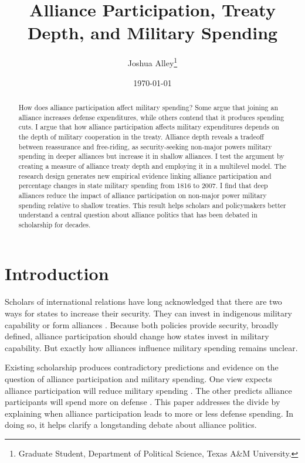 \documentclass[12pt]{article}
\title{\textbf{Alliance Participation, Treaty Depth, and Military Spending}}
\author{Joshua Alley\footnote{Graduate Student,
Department of Political Science, Texas A\&M University.}}
\date{{\normalsize \today}}
\begin{document}
\maketitle 

\doublespace 

\begin{abstract}
How does alliance participation affect military spending? 
Some argue that joining an alliance increases defense expenditures, while others contend that it produces spending cuts.
I argue that how alliance participation affects military expenditures depends on the depth of military cooperation in the treaty. 
Alliance depth reveals a tradeoff between reassurance and free-riding, as security-seeking non-major powers military spending in deeper alliances but increase it in shallow alliances.   
I test the argument by creating a measure of alliance treaty depth and employing it in a multilevel model. 
The research design generates new empirical evidence linking alliance participation and percentage changes in state military spending from 1816 to 2007. 
I find that deep alliances reduce the impact of alliance participation on non-major power military spending relative to shallow treaties.  
This result helps scholars and policymakers better understand a central question about alliance politics that has been debated in scholarship for decades. 
\end{abstract}


 \newpage 


\section{Introduction}


Scholars of international relations have long acknowledged that there are two ways for states to increase their security. 
They can invest in indigenous military capability or form alliances \citep{Morgenthau1948, Altfield1984, Morrow1993}.
Because both policies provide security, broadly defined, alliance participation should change how states invest in military capability. 
But exactly how alliances influence military spending remains unclear. 


Existing scholarship produces contradictory predictions and evidence on the question of alliance participation and military spending. 
One view expects alliance participation will reduce military spending \citep{Morrow1993, Conybeare1994}. 
The other predicts alliance participants will spend more on defense \citep{Diehl1994, MorganPalmer2006}.
This paper addresses the divide by explaining when alliance participation leads to more or less defense spending. 
In doing so, it helps clarify a longstanding debate about alliance politics.
\end{document}
